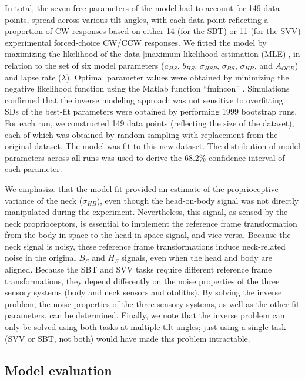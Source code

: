 In total, the seven free parameters of the model had to account for 149 data points, spread across various tilt angles, with each data point reflecting a proportion of CW responses based on either 14 (for the SBT) or 11 (for the SVV) experimental forced-choice CW/CCW responses. We fitted the model by maximizing the likelihood of the data [maximum likelihood estimation (MLE)], in relation to the set of six model parameters ($a_{HS}$, $b_{HS}$, $\sigma_{HSP}$, $\sigma_{BS}$, $\sigma_{HB}$, and $A_{OCR}$) and lapse rate ($\lambda$). Optimal parameter values were obtained by minimizing the negative likelihood function using the Matlab function ``fmincon'' \cite{devrijer2008, mcguire2009}. Simulations confirmed that the inverse modeling approach was not sensitive to overfitting. SDs of the best-fit parameters were obtained by performing 1999 bootstrap runs. For each run, we constructed 149 data points (reflecting the size of the dataset), each of which was obtained by random sampling with replacement from the original dataset. The model was fit to this new dataset. The distribution of model parameters across all runs was used to derive the 68.2\% confidence interval of each parameter. 

We emphasize that the model fit provided an estimate of the proprioceptive variance of the neck ($\sigma_{HB}$), even though the head-on-body signal was not directly manipulated during the experiment. Nevertheless, this signal, as sensed by the neck proprioceptors, is essential to implement the reference frame transformation from the body-in-space to the head-in-space signal, and vice versa. Because the neck signal is noisy, these reference frame transformations induce neck-related noise in the original $B_S$ and $H_S$ signals, even when the head and body are aligned. Because the SBT and SVV tasks require different reference frame transformations, they depend differently on the noise properties of the three sensory systems (body and neck sensors and otoliths). By solving the inverse problem, the noise properties of the three sensory systems, as well as the other fit parameters, can be determined. Finally, we note that the inverse problem can only be solved using both tasks at multiple tilt angles; just using a single task (SVV or SBT, not both) would have made this problem intractable. 

\subsection{Model evaluation}

